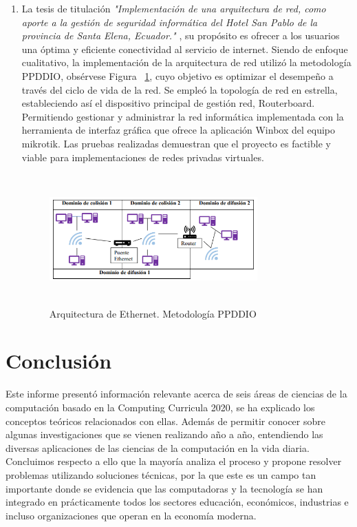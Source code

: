 \documentclass[10pt,conference]{IEEEtran}
\begin{document}
\begin {enumerate}
\item La tesis de titulación \textit{"Implementación de una arquitectura de red, como aporte a la gestión de seguridad informática del Hotel San Pablo de la provincia de Santa Elena, Ecuador."} \citep{alvarez2022implementacion}, su propósito es ofrecer a los usuarios una óptima y eficiente conectividad al servicio de internet. Siendo de enfoque cualitativo, la implementación de la arquitectura de red utilizó la metodología PPDDIO, obsérvese Figura ~\ref{fhot}, cuyo objetivo es optimizar el desempeño a través del ciclo de vida de la red. Se empleó la topología de red en estrella, estableciendo así el dispositivo principal de gestión red, Routerboard. Permitiendo gestionar y administrar la red informática implementada con la herramienta de interfaz gráfica que ofrece la aplicación Winbox del equipo mikrotik. Las pruebas realizadas demuestran que el proyecto es factible y viable para implementaciones de redes privadas virtuales.

\begin{figure}[H]
 \begin{center}
       \includegraphics[width=8cm, height=5cm]{figuras/hotel.PNG}
      \caption{Arquitectura de Ethernet. Metodología PPDDIO}
      \label{fhot} 
      \end{center}
\end{figure}


\end{enumerate}
\section{\textbf{Conclusión}}
Este informe presentó información relevante acerca de seis áreas de ciencias de la computación basado en la Computing Curricula 2020, se ha explicado los conceptos teóricos relacionados con ellas. Además de permitir conocer sobre algunas investigaciones que se vienen realizando año a año, entendiendo las diversas aplicaciones de las ciencias de la computación en la vida diaria. Concluimos respecto a ello que la mayoría analiza el proceso y propone resolver problemas utilizando soluciones técnicas, por la que este es un campo tan importante donde se evidencia que las computadoras y la tecnología se han integrado en prácticamente todos los sectores educación, económicos, industrias e incluso organizaciones que operan en la economía moderna.
\medskip

\end{document}
